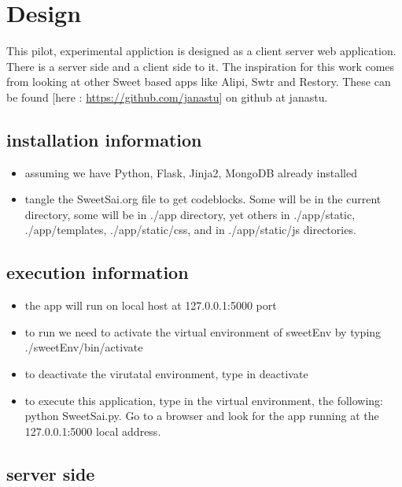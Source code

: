 \documentclass[11pt]{article}
\begin{document}
\section{Design}
\label{sec-3}

This pilot, experimental appliction is designed as a client server web
application. There is a server side and a client side to it. The
inspiration for this work comes from looking at other Sweet based apps
like Alipi, Swtr and Restory. These can be found [here :
\href{https://github.com/janastu}{https://github.com/janastu}] on github at janastu.
\subsection{installation information}
\label{sec-3-1}

\begin{itemize}
\item assuming we have Python, Flask, Jinja2, MongoDB already installed
\item tangle the SweetSai.org file to get codeblocks. Some will be in the
  current directory, some will be in ./app directory, yet others in
  ./app/static, ./app/templates, ./app/static/css, and in
  ./app/static/js directories.
\end{itemize}
\subsection{execution information}
\label{sec-3-2}

\begin{itemize}
\item the app will run on local host at 127.0.0.1:5000 port
\item to run we need to activate the virtual environment of sweetEnv by
  typing ./sweetEnv/bin/activate
\item to deactivate the virutatal environment, type in deactivate
\item to execute this application, type in the virtual environment, the
  following: python SweetSai.py. Go to a browser and look for the app
  running at the 127.0.0.1:5000 local address.
\end{itemize}
\subsection{server side}
\label{sec-3-3}
\end{document}
